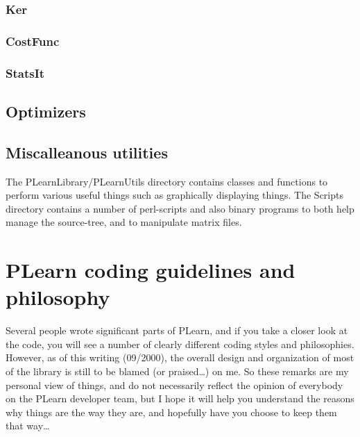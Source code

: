\documentclass[11pt]{book}
\begin{document}
\subsection{Ker}
\subsection{CostFunc}
\subsection{StatsIt}
\section{Optimizers}
\label{Optimizer}

% 
% 
\section{ Miscalleanous utilities}

 The PLearnLibrary/PLearnUtils directory contains classes and
functions to perform various useful things such as graphically
displaying things. The Scripts directory contains a number of
perl-scripts and also binary programs to both help manage the
source-tree, and to manipulate matrix files.


\chapter{ PLearn coding guidelines and philosophy}

 Several people wrote significant parts of PLearn, and if you take a
closer look at the code, you will see a number of clearly different
coding styles and philosophies. However, as of this writing (09/2000),
the overall design and organization of most of the library is still to
be blamed (or praised\ldots) on me. So these remarks are my personal
view of things, and do not necessarily reflect the opinion of everybody
on the PLearn developer team, but I hope it will help you understand
the reasons why things are the way they are, and hopefully have you
choose to keep them that way\ldots
\end{document}
